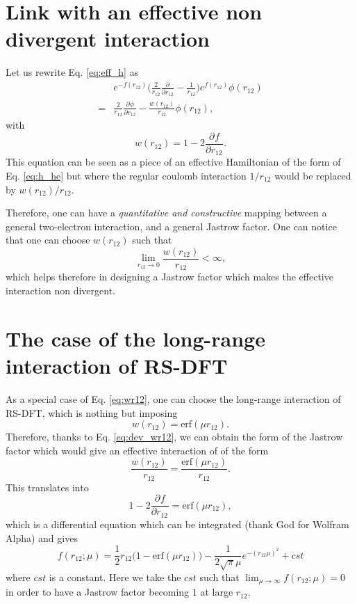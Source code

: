 \documentclass[aip,jcp,reprint,noshowkeys,superscriptaddress]{revtex4-1}
\newcommand{\deriv}[3]{\frac{\partial^{#3} #1}{\partial {#2}^{#3}}}
\begin{document}
\section{Link with an effective non divergent interaction}
Let us rewrite Eq. \eqref{eq:eff_h} as 
\begin{equation}
 \label{eq:eff_h}
 \begin{aligned}
 & e^{-f(r_{12})} \bigg( \frac{2}{r_{12}} \deriv{}{r_{12}}{} -\frac{1}{r_{12}}\bigg) e^{f(r_{12})} \phi(r_{12}) \\ 
 =& \frac{2}{r_{12}} \deriv{\phi}{r_{12}}{} - \frac{w(r_{12})}{r_{12}} \phi(r_{12}),
 \end{aligned}
\end{equation}
with 
\begin{equation}
 \label{eq:dev_wr12}
 w(r_{12}) =  1-  2 \deriv{f}{r_{12}}{}.
\end{equation}
This equation can be seen as a piece of an effective Hamiltonian of the form of Eq. \eqref{eq:h_he} but where the regular coulomb interaction $1/r_{12}$ would be replaced by $w(r_{12})/r_{12}$. 

Therefore, one can have a \textit{quantitative and constructive} mapping between a general two-electron interaction, and a general Jastrow factor. 
One can notice that one can choose $w(r_{12})$ such that 
\begin{equation}
 \label{eq:wr12}
 \lim_{r_{12}\rightarrow 0} \frac{w(r_{12})}{r_{12}} < \infty,
\end{equation}
which helps therefore in designing a Jastrow factor which makes the effective interaction non divergent. 


\section{The case of the long-range interaction of RS-DFT}
As a special case of Eq. \eqref{eq:wr12}, one can choose the long-range interaction of RS-DFT, which is nothing but imposing 
\begin{equation}
 w(r_{12}) = \text{erf}(\mu r_{12}). 
\end{equation}
Therefore, thanks to Eq. \eqref{eq:dev_wr12}, we can obtain the form of the Jastrow factor which would give an effective interaction of of the form 
\begin{equation}
 \frac{w(r_{12})}{r_{12}} = \frac{\text{erf}(\mu r_{12})}{r_{12}}. 
\end{equation}
This translates into 
\begin{equation}
 1-  2 \deriv{f}{r_{12}}{} = \text{erf}(\mu r_{12}), 
\end{equation}
which is a differential equation which can be integrated (thank God for Wolfram Alpha) and gives
\begin{equation}
 \label{eq:def_f}
 f(r_{12};\mu) = \frac{1}{2}r_{12}\bigg( 1 - \text{erf}(\mu r_{12})  \bigg) - \frac{1}{2\sqrt{\pi}\mu}e^{-(r_{12}\mu)^2} + cst
\end{equation}
where $cst$ is a constant. Here we take the $cst$ such that $\lim_{\mu \rightarrow \infty} f(r_{12};\mu) = 0$ in order to have a Jastrow factor becoming $1$ at large $r_{12}$. 
\end{document}
